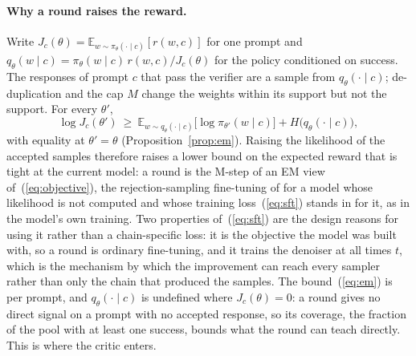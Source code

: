 \paragraph{Why a round raises the reward.}
Write $J_c(\theta)=\mathbb E_{w\sim\pi_\theta(\cdot\mid c)}[r(w,c)]$ for one prompt and $q_\theta(w\mid c)=\pi_\theta(w\mid c)\,r(w,c)/J_c(\theta)$ for the policy conditioned on success. The responses of prompt $c$ that pass the verifier are a sample from $q_\theta(\cdot\mid c)$; de-duplication and the cap $M$ change the weights within its support but not the support. For every $\theta'$,
\begin{equation}
\log J_c(\theta')\ \ge\ \mathbb E_{w\sim q_\theta(\cdot\mid c)}\big[\log\pi_{\theta'}(w\mid c)\big]+H\big(q_\theta(\cdot\mid c)\big),
\label{eq:em}
\end{equation}
with equality at $\theta'=\theta$ (Proposition~\ref{prop:em}). Raising the likelihood of the accepted samples therefore raises a lower bound on the expected reward that is tight at the current model: a round is the M-step of an EM view of~(\ref{eq:objective}), the rejection-sampling fine-tuning of \citet{yuan2023rft,singh2023restem,zelikman2022star} for a model whose likelihood is not computed and whose training loss~(\ref{eq:sft}) stands in for it, as in the model's own training. Two properties of~(\ref{eq:sft}) are the design reasons for using it rather than a chain-specific loss: it is the objective the model was built with, so a round is ordinary fine-tuning, and it trains the denoiser at all times $t$, which is the mechanism by which the improvement can reach every sampler rather than only the chain that produced the samples. The bound~(\ref{eq:em}) is per prompt, and $q_\theta(\cdot\mid c)$ is undefined where $J_c(\theta)=0$: a round gives no direct signal on a prompt with no accepted response, so its coverage, the fraction of the pool with at least one success, bounds what the round can teach directly. This is where the critic enters.

